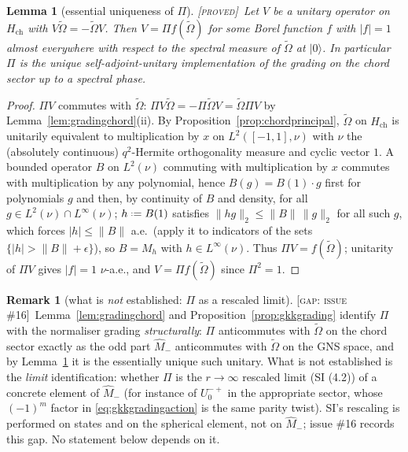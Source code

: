 \documentclass[11pt,a4paper]{article}
\providecommand{\coloneqq}{\mathrel{\vcenter{\baselineskip0.5ex \lineskiplimit0pt
      \hbox{\scriptsize.}\hbox{\scriptsize.}}}=}
\newcommand{\PROVED}{{\color{ForestGreen}\textsc{[proved]}}}
\newcommand{\GAP}[1]{{\color{red}\textsc{[gap: issue \##1]}}}
\theoremstyle{definition}
\newtheorem{remark}[definition]{Remark}
\theoremstyle{plain}
\newtheorem{lemma}[definition]{Lemma}
\newcommand{\tCas}{\tilde\Omega}                %
\newcommand{\ket}[1]{|#1\rangle}
\begin{document}
\begin{lemma}[essential uniqueness of $\Pi$]\label{lem:uniqueness}
\PROVED\ Let $V$ be a unitary operator on $H_{\mathrm{ch}}$ with $V\tCas=-\tCas V$. Then
$V=\Pi f(\tCas)$ for some Borel function $f$ with $|f|=1$ almost everywhere with respect to
the spectral measure of $\tCas$ at $\ket{0}$. In particular $\Pi$ is the unique
self-adjoint-unitary implementation of the grading on the chord sector up to a spectral
phase.
\end{lemma}

\begin{proof}
$\Pi V$ commutes with $\tCas$: $\Pi V\tCas=-\Pi\tCas V=\tCas\Pi V$ by
Lemma~\ref{lem:gradingchord}(ii). By Proposition~\ref{prop:chordprincipal}, $\tCas$ on
$H_{\mathrm{ch}}$ is unitarily equivalent to multiplication by $x$ on
$L^{2}([-1,1],\nu)$ with $\nu$ the (absolutely continuous) $q^{2}$-Hermite orthogonality
measure and cyclic vector $1$. A bounded operator $B$ on $L^{2}(\nu)$ commuting with
multiplication by $x$ commutes with multiplication by any polynomial, hence
$B(g)=B(1)\cdot g$ first for polynomials $g$ and then, by continuity of $B$ and density,
for all $g\in L^{2}(\nu)\cap L^{\infty}(\nu)$; $h\coloneqq B(1)$ satisfies
$\|hg\|_{2}\le\|B\|\,\|g\|_{2}$ for all such $g$, which forces $|h|\le\|B\|$ a.e.\ (apply it
to indicators of the sets $\{|h|>\|B\|+\epsilon\}$), so $B=M_{h}$ with
$h\in L^{\infty}(\nu)$. Thus $\Pi V=f(\tCas)$; unitarity of $\Pi V$ gives $|f|=1$
$\nu$-a.e., and $V=\Pi f(\tCas)$ since $\Pi^{2}=1$.
\end{proof}

\begin{remark}[what is \emph{not} established: $\Pi$ as a rescaled limit]\label{rem:pilimit}
\GAP{16}\ Lemma~\ref{lem:gradingchord} and Proposition~\ref{prop:gkkgrading} identify $\Pi$
with the normaliser grading \emph{structurally}: $\Pi$ anticommutes with $\tCas$ on the chord
sector exactly as the odd part $\hat M_{-}$ anticommutes with $\tCas$ on the GNS space, and
by Lemma~\ref{lem:uniqueness} it is the essentially unique such unitary. What is not
established is the \emph{limit} identification: whether $\Pi$ is the $r\to\infty$ rescaled
limit (SI (4.2)) of a concrete element of $\hat M_{-}$ (for instance of $U^{-+}_{0}$ in the
appropriate sector, whose $(-1)^{m}$ factor in \eqref{eq:gkkgradingaction} is the same
parity twist). SI's rescaling is performed on states and on the spherical element, not on
$\hat M_{-}$; issue \#16 records this gap. No statement below depends on it.
\end{remark}
\end{document}
